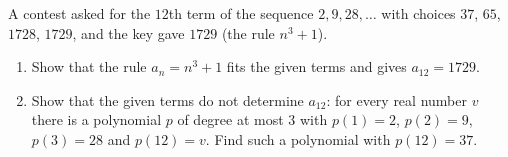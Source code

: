 A contest asked for the $12$th term of the sequence $2,9,28,\dots$ with choices $37$, $65$, $1728$, $1729$, and the key gave $1729$ (the rule $n^3+1$).
\begin{enumerate}
\item[(a)] Show that the rule $a_n=n^3+1$ fits the given terms and gives $a_{12}=1729$.
\item[(b)] Show that the given terms do not determine $a_{12}$: for every real number $v$ there is a polynomial $p$ of degree at most $3$ with $p(1)=2$, $p(2)=9$, $p(3)=28$ and $p(12)=v$. Find such a polynomial with $p(12)=37$.
\end{enumerate}
